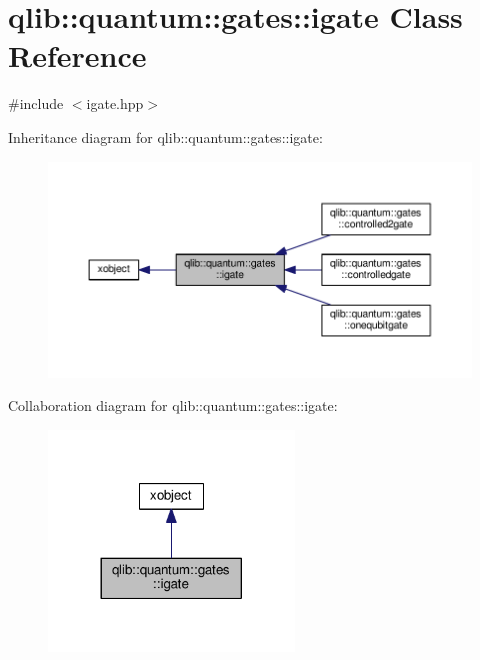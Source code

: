 \hypertarget{classqlib_1_1quantum_1_1gates_1_1igate}{}\section{qlib\+:\+:quantum\+:\+:gates\+:\+:igate Class Reference}
\label{classqlib_1_1quantum_1_1gates_1_1igate}


{\ttfamily \#include $<$igate.\+hpp$>$}



Inheritance diagram for qlib\+:\+:quantum\+:\+:gates\+:\+:igate\+:\nopagebreak
\begin{figure}[H]
\begin{center}
\leavevmode
\includegraphics[width=350pt]{classqlib_1_1quantum_1_1gates_1_1igate__inherit__graph}
\end{center}
\end{figure}


Collaboration diagram for qlib\+:\+:quantum\+:\+:gates\+:\+:igate\+:\nopagebreak
\begin{figure}[H]
\begin{center}
\leavevmode
\includegraphics[width=185pt]{classqlib_1_1quantum_1_1gates_1_1igate__coll__graph}
\end{center}
\end{figure}
